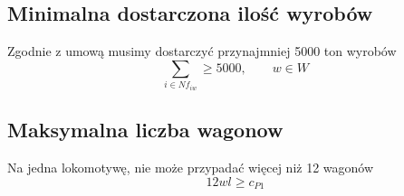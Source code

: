 \subsection{Minimalna dostarczona ilość wyrobów}
Zgodnie z umową musimy dostarczyć przynajmniej 5000 ton wyrobów
\begin{equation}
\sum_{i \in N f_{iw}} \geq 5000, \qquad w \in W
\end{equation}
\subsection{Maksymalna liczba wagonow}
Na jedna lokomotywę, nie może przypadać więcej niż 12 wagonów
\begin{equation}
12wl \geq c_{P1}
\end{equation}

